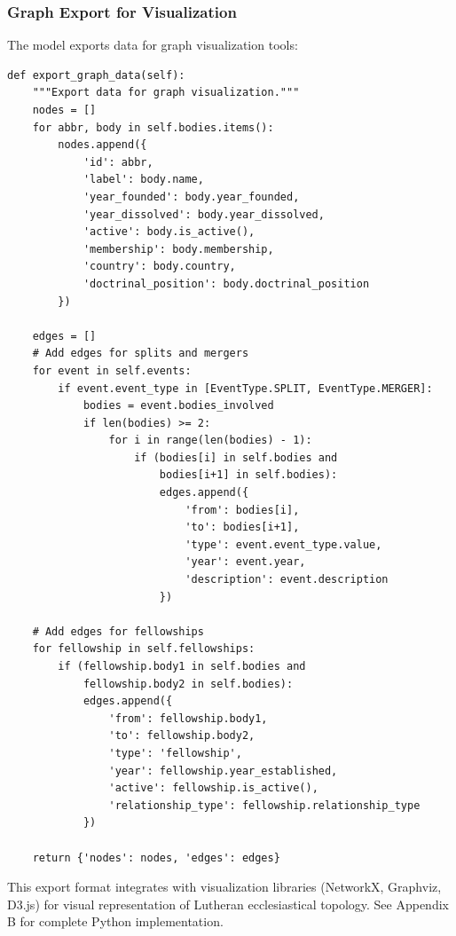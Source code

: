\subsubsection{Graph Export for Visualization}

The model exports data for graph visualization tools:

\begin{verbatim}
def export_graph_data(self):
    """Export data for graph visualization."""
    nodes = []
    for abbr, body in self.bodies.items():
        nodes.append({
            'id': abbr,
            'label': body.name,
            'year_founded': body.year_founded,
            'year_dissolved': body.year_dissolved,
            'active': body.is_active(),
            'membership': body.membership,
            'country': body.country,
            'doctrinal_position': body.doctrinal_position
        })

    edges = []
    # Add edges for splits and mergers
    for event in self.events:
        if event.event_type in [EventType.SPLIT, EventType.MERGER]:
            bodies = event.bodies_involved
            if len(bodies) >= 2:
                for i in range(len(bodies) - 1):
                    if (bodies[i] in self.bodies and
                        bodies[i+1] in self.bodies):
                        edges.append({
                            'from': bodies[i],
                            'to': bodies[i+1],
                            'type': event.event_type.value,
                            'year': event.year,
                            'description': event.description
                        })

    # Add edges for fellowships
    for fellowship in self.fellowships:
        if (fellowship.body1 in self.bodies and
            fellowship.body2 in self.bodies):
            edges.append({
                'from': fellowship.body1,
                'to': fellowship.body2,
                'type': 'fellowship',
                'year': fellowship.year_established,
                'active': fellowship.is_active(),
                'relationship_type': fellowship.relationship_type
            })

    return {'nodes': nodes, 'edges': edges}
\end{verbatim}

This export format integrates with visualization libraries (NetworkX, Graphviz, D3.js) for visual representation of Lutheran ecclesiastical topology. See Appendix B for complete Python implementation.

